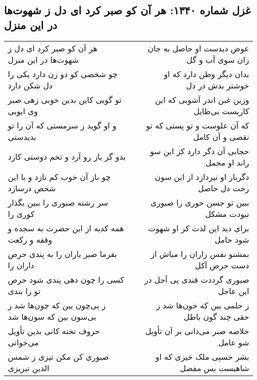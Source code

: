 \begin{center}
\section*{غزل شماره ۱۳۴۰: هر آن کو صبر کرد ای دل ز شهوت‌ها در این منزل}
\label{sec:1340}
\begin{longtable}{l p{0.5cm} r}
هر آن کو صبر کرد ای دل ز شهوت‌ها در این منزل
&&
عوض دیدست او حاصل به جان زان سوی آب و گل
\\
چو شخصی کو دو زن دارد یکی را دل شکن دارد
&&
بدان دیگر وطن دارد که او خوشتر بدش در دل
\\
تو گویی کاین بدین خوبی زهی صبر وی ایوبی
&&
وزین غبن اندر آشوبی که این کاریست بی‌طایل
\\
و او گوید ز سرمستی که آن را تو بدیدستی
&&
که آن علوست و تو پستی که تو نقصی و آن کامل
\\
بدو گر باز رو آرد و تخم دوستی کارد
&&
حجابی آن دگر دارد کز این سو راند او محمل
\\
چو باز آن خوب کم نازد و با این شخص درسازد
&&
دگربار او نپردازد از این سون رخت دل حاصل
\\
سر رشته صبوری را ببین بگذار کوری را
&&
ببین تو حسن حوری را صبوری نبودت مشکل
\\
همه کدیه از این حضرت به سجده و وقفه و رکعت
&&
برای دید این لذت کز او شهوت شود حامل
\\
بفرما صبر یاران را به پندی حرص داران را
&&
بمشنو نفس زاران را مباش از دست حرص آکل
\\
کسی را چون دهی پندی شود حرص تو را بندی
&&
صبوری گرددت قندی پی آجل در این عاجل
\\
ز بی‌چون بین که چون‌ها شد ز بی‌سون بین که سون‌ها شد
&&
ز حلمی بین که خون‌ها شد ز حقی چند گون باطل
\\
حروف تخته کانی بدین تأویل می‌خوانی
&&
خلاصه صبر می‌دانی بر آن تأویل شو عامل
\\
صبوری کن مکن تیزی ز شمس الدین تبریزی
&&
بشر خسپی ملک خیزی که او شاهیست بس مفضل
\\
\end{longtable}
\end{center}

